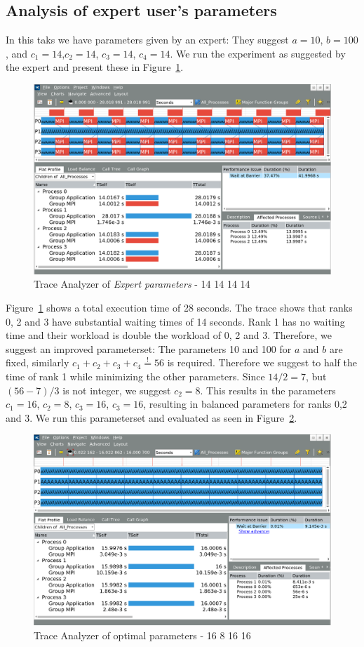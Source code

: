 \documentclass[article]{scrartcl}
\begin{document}
\subsection{Analysis of expert user's parameters}
In this taks we have parameters given by an expert: They suggest $a=10$, $b=100$, and $c_1=14$,$c_2=14$, $c_3=14$, $c_4=14$.
We run the experiment as suggested by the expert and present these in Figure~\ref{fig:expert1}.
\begin{figure}[htpb]
	\centering
	\includegraphics[width=.9\textwidth,keepaspectratio=true]{../figs/4_3_14_14_14_14.png}
	\caption{Trace Analyzer of \textit{Expert parameters} - 14 14 14 14}
	\label{fig:expert1}
\end{figure}
Figure~\ref{fig:expert1} shows a total execution time of 28 seconds. The trace shows that ranks 0, 2 and 3 have substantial waiting times of 14 seconds. Rank 1 has no waiting time and their workload is double the workload of 0, 2 and 3.
Therefore, we suggest an improved parameterset: The parameters 10 and 100 for $a$ and $b$ are fixed, similarly $c_1+c_2+c_3+c_4 \overset{!}{=} 56$ is required. Therefore we suggest to half the time of rank 1 while minimizing the other parameters. Since $14/2=7$, but $(56-7)/3$ is not integer, we suggest $c_2=8$. This results in the parameters $c_1=16$, $c_2=8$, $c_3=16$, $c_3=16$, resulting in balanced parameters for ranks 0,2 and 3.
We run this parameterset and evaluated as seen in Figure~\ref{fig:expert2}.
\begin{figure}[htpb]
	\centering
	\includegraphics[width=.9\textwidth,keepaspectratio=true]{../figs/4_3_16_8_16_16.png}
	\caption{Trace Analyzer of optimal parameters - 16 8 16 16}
	\label{fig:expert2}
\end{figure}
\end{document}
